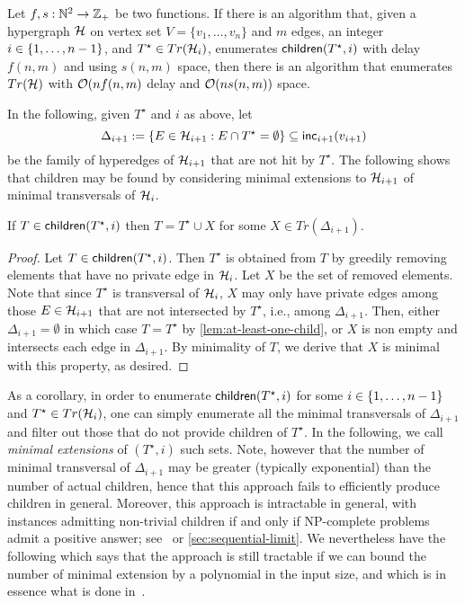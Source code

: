 \begin{theorem}
    Let \(f, s: \mathbb{N}^{2} \rightarrow \mathbb{Z}_{+}\) be two functions. If there is an algorithm that, given a hypergraph \(\mathcal{H}\) on vertex set \(V = \{v_{1}, \dots, v_{n}\}\) and $m$ edges, an integer \(i \in \{1,\dots,n-1\}\), and \(T^{\star} \in Tr(\mathcal{H}_{i})\), enumerates \(\operatorname{{\sf children}}(T^{\star}, i)\) with delay \(f(n, m)\) and using \(s(n, m)\) space, then there is an algorithm that enumerates \(Tr(\mathcal{H})\) with \(\mathcal{O}(n f(n, m)\) delay and \(\mathcal{O}(n s(n, m))\) space.
\end{theorem}

In the following, given $T^{\star}$ and $i$ as above, let 
\[
    \Delta_{i+1}:=\{E\in \mathcal{H}_{i+1} : E\cap T^{\star}=\emptyset\}\subseteq \operatorname{{\sf inc}}_{i+1}(v_{i+1})
\]
be the family of hyperedges of $\mathcal{H}_{i+1}$ that are not hit by $T^\star$.
The following shows that children may be found by considering minimal extensions to $\mathcal{H}_{i+1}$ of minimal transversals of $\mathcal{H}_{i}$.

\begin{lemma}\label{lem:extensions}
    If $T\in \operatorname{{\sf children}}(T^\star,i)$ then $T=T^\star\cup X$ for some $X\in Tr(\Delta_{i+1})$.
\end{lemma}

\begin{proof}
    Let $T\in \operatorname{{\sf children}}(T^\star,i)$.
    Then $T^\star$ is obtained from $T$ by greedily removing elements that have no private edge in $\mathcal{H}_i$.
    Let $X$ be the set of removed elements.
    Note that since $T^\star$ is transversal of $\mathcal{H}_i$, $X$ may only have private edges among those $E\in \mathcal{H}_{i+1}$ that are not intersected by $T^\star$, i.e., among $\Delta_{i+1}$.
    Then, either $\Delta_{i+1}=\emptyset$ in which case $T=T^\star$ by \autoref{lem:at-least-one-child}, or $X$ is non empty and intersects each edge in $\Delta_{i+1}$.
    By minimality of $T$, we derive that $X$ is minimal with this property, as desired.
\end{proof}

As a corollary, in order to enumerate $\operatorname{{\sf children}}(T^{\star}, i)$ for some $i\in \{1,\dots,n-1\}$ and $T^{\star}\in Tr(\mathcal{H}_i)$, one can simply enumerate all the minimal transversals of $\Delta_{i+1}$ and filter out those that do not provide children of $T^\star$.
In the following, we call \emph{minimal extensions} of $(T^{\star}, i)$ such sets.
Note, however that the number of minimal transversal of $\Delta_{i+1}$ may be greater (typically exponential) than the number of actual children, hence that this approach fails to efficiently produce children in general.
Moreover, this approach is intractable in general, with instances admitting non-trivial children if and only if NP-complete problems admit a positive answer; see~\cite{bartier2024hypergraph} or \autoref{sec:sequential-limit}.
We nevertheless have the following which says that the approach is still tractable if we can bound the number of minimal extension by a polynomial in the input size, and which is in essence what is done in~\cite{eiter2003new}.

